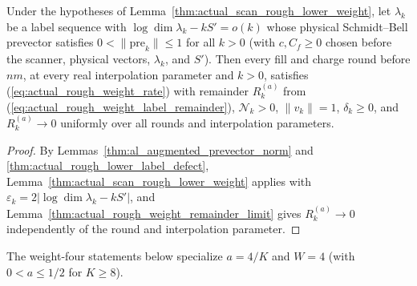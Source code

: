 \begin{lemma}
    \label{thm:actual_supplied_rough_lower_weight}
    \leanok
    Under the hypotheses of Lemma~\ref{thm:actual_scan_rough_lower_weight},
    let $\lambda_k$ be a label sequence with $\log\dim\lambda_k-kS'=o(k)$ whose
    physical Schmidt--Bell prevector satisfies $0<\|\mathrm{pre}_k\|\leq1$ for
    all $k>0$ (with $c,C_f\geq0$ chosen before the scanner, physical vectors,
    $\lambda_k$, and $S'$). Then every fill and charge round before $nm$, at
    every real interpolation parameter and $k>0$, satisfies
    (\ref{eq:actual_rough_weight_rate}) with remainder $R_k^{(a)}$ from
    (\ref{eq:actual_rough_weight_label_remainder}), $\mathcal N_k>0$,
    $\|v_k\|=1$, $\delta_k\geq0$, and $R_k^{(a)}\to0$ uniformly over all rounds
    and interpolation parameters.
\end{lemma}
\begin{proof}
    \leanok
    By Lemmas~\ref{thm:al_augmented_prevector_norm} and
    \ref{thm:actual_rough_lower_label_defect},
    Lemma~\ref{thm:actual_scan_rough_lower_weight} applies with
    $\varepsilon_k=2|\log\dim\lambda_k-kS'|$, and
    Lemma~\ref{thm:actual_rough_weight_remainder_limit} gives $R_k^{(a)}\to0$
    independently of the round and interpolation parameter.
\end{proof}

The weight-four statements below specialize $a=4/K$ and $W=4$ (with
$0<a\leq1/2$ for $K\geq8$).

